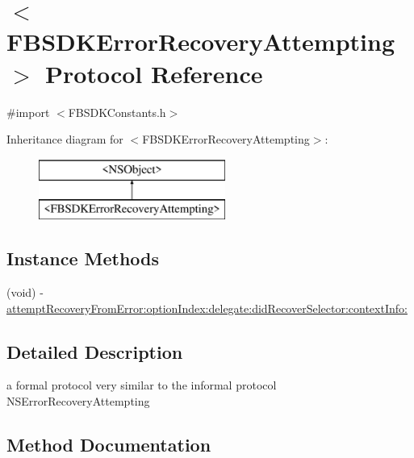 \hypertarget{protocol_f_b_s_d_k_error_recovery_attempting-p}{}\section{$<$F\+B\+S\+D\+K\+Error\+Recovery\+Attempting$>$ Protocol Reference}
\label{protocol_f_b_s_d_k_error_recovery_attempting-p}


{\ttfamily \#import $<$F\+B\+S\+D\+K\+Constants.\+h$>$}

Inheritance diagram for $<$F\+B\+S\+D\+K\+Error\+Recovery\+Attempting$>$\+:\begin{figure}[H]
\begin{center}
\leavevmode
\includegraphics[height=2.000000cm]{protocol_f_b_s_d_k_error_recovery_attempting-p}
\end{center}
\end{figure}
\subsection*{Instance Methods}
\begin{DoxyCompactItemize}
\item 
(void) -\/ \hyperlink{protocol_f_b_s_d_k_error_recovery_attempting-p_ad30e4446144df6e728789726bc8db056}{attempt\+Recovery\+From\+Error\+:option\+Index\+:delegate\+:did\+Recover\+Selector\+:context\+Info\+:}
\end{DoxyCompactItemize}


\subsection{Detailed Description}
a formal protocol very similar to the informal protocol N\+S\+Error\+Recovery\+Attempting 

\subsection{Method Documentation}
\hypertarget{protocol_f_b_s_d_k_error_recovery_attempting-p_ad30e4446144df6e728789726bc8db056}{}
